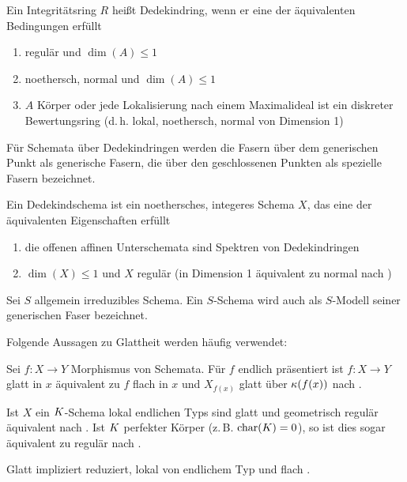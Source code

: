 \documentclass[german, bibliography=totoc]{scrreprt}
\renewcommand*{\optcite}[2][]{}
\begin{document}
\begin{Definition}[Dedekindring]\label{def:dedekindring}
  \optcite[S.\,40]{hartshorne}\optcite[Definition B.84]{wedhorn}
  Ein Integritätsring $R$ heißt Dedekindring, wenn er eine der
  äquivalenten Bedingungen erfüllt
  \begin{enumerate}[label=(\roman*)]
  \item regulär und $\dim(A)\leq 1$
  \item noethersch, normal und $\dim(A)\leq 1$    
  \item $A$ Körper oder
    jede Lokalisierung nach einem Maximalideal ist ein diskreter
    Bewertungsring
    (d.\,h. lokal, noethersch, normal von Dimension 1)
  \end{enumerate}
\end{Definition}
Für Schemata über Dedekindringen werden die Fasern über dem
generischen Punkt als generische Fasern, die über den geschlossenen
Punkten als spezielle Fasern bezeichnet.
\begin{Definition}[Dedekindschema]
  Ein Dedekindschema ist ein noethersches, integeres Schema $X$, das
  eine der äquivalenten Eigenschaften erfüllt
  \begin{enumerate}[label=(\roman*)]
  \item die offenen affinen Unterschemata sind Spektren von Dedekindringen
  \item $\dim(X)\leq 1$ und $X$ regulär
    (in Dimension 1 äquivalent zu normal nach
    \cite[Corollary 6.39, Proposition 6.40]{wedhorn})
  \end{enumerate}
\end{Definition}
Sei $S$ allgemein irreduzibles Schema. Ein $S$-Schema wird auch als
$S$-Modell seiner generischen Faser bezeichnet.

Folgende Aussagen zu Glattheit werden häufig verwendet:
\begin{Bemerkung}\label{thm:eigglatt}
  Sei $f\colon X\to Y$ Morphismus von Schemata.
  Für $f$ endlich präsentiert ist $f\colon X\to Y $ glatt in $x$
  äquivalent zu $f$ flach in $x$ und $X_{f(x)}$ glatt über $\kappa(f(x))$ nach
  \cite[8.5, Proposition 17]{bosch}.
  
  Ist $X$ ein $K$-Schema lokal endlichen Typs sind glatt und
  geometrisch regulär äquivalent nach \cite[Corollary 6.32]{wedhorn}.
  Ist $K$ perfekter Körper (z.\,B. $\operatorname{char}(K)=0$), so ist dies sogar
  äquivalent zu regulär nach \cite[Remark 6.33]{wedhorn}.
    
  Glatt impliziert reduziert, lokal von endlichem Typ und flach
  \cite[für flach s.][Theorem 14.22]{wedhorn}.
\end{Bemerkung}
\end{document}
